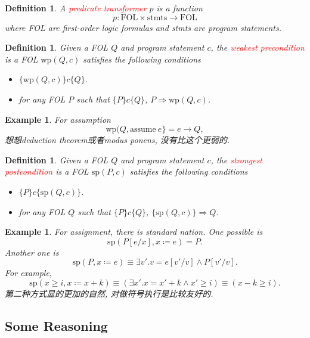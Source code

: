 \documentclass{article}
\newtheorem{example}[theorem]{Example}
\newtheorem{definition}[theorem]{Definition}
\newcommand{\redt}[1]{\textcolor{red}{#1}}
\begin{document}
\begin{definition}
\rm A \redt{predicate transformer} $p$ is a function
\[
    p: \text{FOL} \times \text{stmts} \to \text{FOL}
\]
where FOL are first-order logic formulas and stmts are program statements.
\end{definition}

\begin{definition}
\rm Given a FOL $Q$ and program statement $c$, the \redt{weakest precondition} is a FOL $\text{wp}(Q, c)$ satisfies the following conditions
\begin{itemize}
    \item $\{\text{wp}(Q, c)\}c\{Q\}$.
    \item for any FOL $P$ such that $\{P\}c\{Q\}$, $P \Rightarrow \text{wp}(Q, c)$.
\end{itemize}  
\end{definition}

\begin{example}
\rm For assumption 
\[
    \text{wp}(Q, \text{assume}~e\} = e \to Q,
\]
想想deduction theorem或者modus ponens, 没有比这个更弱的.  
\end{example}

\begin{definition}
\rm Given a FOL $Q$ and program statement $c$, the \redt{strongest postcondition} is a FOL $\text{sp}(P, c)$ satisfies the following conditions
\begin{itemize}
    \item $\{P\}c\{\text{sp}(Q, c)\}$.
    \item for any FOL $Q$ such that $\{P\}c\{Q\}$, $\{\text{sp}(Q, c)\} \Rightarrow Q$.
\end{itemize}
\end{definition}

\begin{example}
\rm For assignment, there is standard nation. One possible is  
\[
    \text{sp}(P[e/x], x \coloneqq e) = P.
\]
Another one is 
\[
    \text{sp}(P, x \coloneqq e) \equiv \exists v'. v = e[v'/v] \wedge P[v'/v].
\]
For example, 
\[
    \text{sp}(x \geq i, x \coloneqq x+k) \equiv (\exists x'. x = x' + k \wedge x' \geq i) \equiv (x-k \geq i). 
\]
第二种方式显的更加的自然, 对做符号执行是比较友好的.  
\end{example}



\subsection{Some Reasoning}
\end{document}
